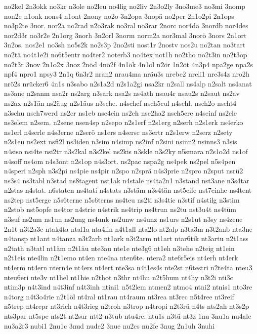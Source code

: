 {no2kel
2n3okk
no3kr
n3ole
no2leu
no4lig
no2liv
2n3o2ly
3no3me3
no3mi
3nomp
non2e
n1onk
nons4
n1ont
2nony
no2o
3n2opa
3nopä
no2per
2n1o2pi
2n1ops
no3p2te
3nor.
nor2a
no2rad
n2o3rak
no3ral
no3rar
2norc
nor4da
3nordb
nor4des
nor2d3r
no3r2e
2n1org
3norh
3n2orl
3norm
norm2a
nor3mal
3norö
3nors
2n1ort
3n2os.
nos2e1
no3sh
no5s2k
no2s3p
2no2sti
nost1r
2nostv
nos2u
no2tan
no3tart
no2tä
no4t1e2i
no6t5entr
no4ter2
noterb3
no4tex
not1h
no2tho
no2t3in
no2t3op
no2t3r
3nov
2n1o2x
3noz
2nöd
4nö2f
4n1ök
4n1öl
n2ör
1n2öt
4n3p4
npa2ge
npa2s
npf4
npro1
npsy3
2n1q
6n3r2
nran2
nrau4ma
nräu3s
nrebe2
nreli1
nre3s4z
nro2h
nrö2s
nrücker6
4n1s
n3sabo
n2s1a2d
n2s1a2gi
nsa2kr
n2sall
ns4alp
n2salt
ns4anat
ns3ane
n2sanm
nsa2r
ns2arg
n3sark
nsa2s
ns4ath
nsau4r
nsau2s
n2saut
ns2av
ns2ax
n2s1än
ns2äug
n2s1äus
n3sche.
n4schef
nsch5eul
n4schl.
nsch2o
nscht4
n3schu
nsch7werd
ns2cr
ns1eb
nse4ein
ns2eh
nse2ha2
nseh5ere
n4seinf
ns2ele
ns3elem
n2sem.
n2sene
nsen4sp
n2sepo
n2s1erf
n2s1erg
n2serh
n2s1erk
ns4erko
ns1erl
n4serle
n4s3erne
n2serö
ns1ers
n4sersc
ns3ertr
n2s1erw
n2serz
n2sety
n2s1eu
ns2ext
nsfi2l
ns3iden
n3sim
n4simp
ns2inf
n2sini
nsinn2
nsinns3
n3sis
n4siso
nsi4te
nsi2tr
n3s2kal
n3s2kel
ns2kis
n3skle
n3s2ky
n5smara
n2s1o2d
ns1of
n4soff
ns4om
n4s3ont
n2s1op
n4s3ort.
ns2pac
nspa2g
ns4pek
ns2pel
n5s4pen
n4speri
n2sph
n3s2pi
ns4pie
ns4pir
n2spo
n2sprä
n4s3prie
n2spro
n2sput
nsrü2
ns3s4
ns3tabl
n3stad
ns8tagent
nst1ak
n4stale
ns4ta2n1
n3stand
nst3ane
n3s4tar
n2stas
n4stat.
n6staten
ns4tati
n4stats
n3stäm
n3s4tän
nst5eife
nst7einhe
ns4tent
ns2tep
nst5erge
n5s6terne
n5s6terns
ns4teu
ns2ti
n3s4tic
n3stif
n4stilg
n3stim
n2stob
nst5opfe
ns4tor
n4strie
n4strik
ns4trip
ns4trun
ns2tu
nst3u4t
ns4tüm
n3suf
ns2um
ns1un
ns2ung
ns4unk
ns2unw
ns4unz
ns1urs
n2s1ut
n3sy
ns4zene
2n1t
n3t2a3c
ntak4ta
ntal1a
nta4lin
n4t1all
nta2lo
nt2alp
n3ta3m
n3t2anb
nta3ne
n4tansp
nt1ant
n4tanza
n3t2arb
nt1ark
n3t2arm
nt1art
ntar6tik
nt3artu
n2t1ass
n2tath
n3tatl
nt1äm
n2t1äu
nte3au
nte1e
nte3g6
nt1eh
n3tehe
n2teig
nt1ein
n2t1eis
nte4lin
n2t1emo
nt4en
nte4na
nten6te.
ntera2
nte6r5eis
nt4erh
nt4erk
nt4erm
nt4ern
ntern4e
nt4ers
nt4ert
nte3sa
n4t1es4s
nte2st
n6testri
n2te4ta
nteu3
nteu6eri
nte3v
nt1hel
nt1hie
n2thot
n3thr
nt4hu
n2t5hum
nt4hy
n3t2i
nti3c
ntim3p
n4t3ind
n4t3inf
n4t3inh
ntini1
n5t2lem
ntmen2
ntmo4
ntni2
ntnis1
nto3re
n4torg
n4t3o4rie
n2t1öl
nt4ral
nt1rau
nt4raum
nt3rea
nt3rec
n5t4ree
nt3reif
n5trep
nt4repr
nt3rich
n4t3rieg
n2troh
n3trop
n4tropi
n2t3rü
n4ts
nts2ah
nt3s2p
nts3par
nt5spe
nts2t
nt2sur
ntt2
n3tub
ntu4re.
ntu1s
n3tü
nt3z
1nu
3nu1a
nu4ale
nu3a2r3
nubi1
2nu1c
3nud
nude2
3nue
nu2es
nu2fe
3nug
2n1uh
3nuhi
}
